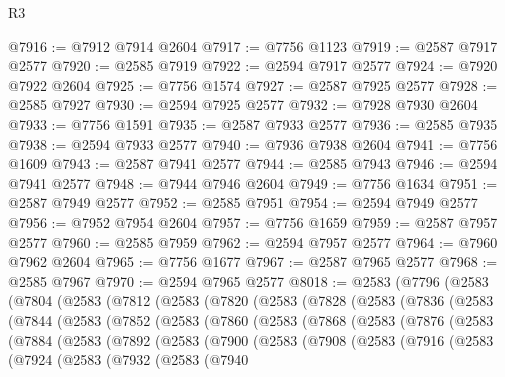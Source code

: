 \begin{lexlean}{R3}
\begin{coremodule}
@7916 := @7912 @7914 @2604
@7917 := @7756 @1123
@7919 := @2587 @7917 @2577
@7920 := @2585 @7919
@7922 := @2594 @7917 @2577
@7924 := @7920 @7922 @2604
@7925 := @7756 @1574
@7927 := @2587 @7925 @2577
@7928 := @2585 @7927
@7930 := @2594 @7925 @2577
@7932 := @7928 @7930 @2604
@7933 := @7756 @1591
@7935 := @2587 @7933 @2577
@7936 := @2585 @7935
@7938 := @2594 @7933 @2577
@7940 := @7936 @7938 @2604
@7941 := @7756 @1609
@7943 := @2587 @7941 @2577
@7944 := @2585 @7943
@7946 := @2594 @7941 @2577
@7948 := @7944 @7946 @2604
@7949 := @7756 @1634
@7951 := @2587 @7949 @2577
@7952 := @2585 @7951
@7954 := @2594 @7949 @2577
@7956 := @7952 @7954 @2604
@7957 := @7756 @1659
@7959 := @2587 @7957 @2577
@7960 := @2585 @7959
@7962 := @2594 @7957 @2577
@7964 := @7960 @7962 @2604
@7965 := @7756 @1677
@7967 := @2587 @7965 @2577
@7968 := @2585 @7967
@7970 := @2594 @7965 @2577
@8018 := @2583
    (@7796
      (@2583
        (@7804
          (@2583
            (@7812
              (@2583
                (@7820
                  (@2583
                    (@7828
                      (@2583
                        (@7836
                          (@2583
                            (@7844
                              (@2583
                                (@7852
                                  (@2583
                                    (@7860
                                      (@2583
                                        (@7868
                                          (@2583
                                            (@7876
                                              (@2583
                                                (@7884
                                                  (@2583
                                                    (@7892
                                                      (@2583
                                                        (@7900
                                                          (@2583
                                                            (@7908
                                                              (@2583
                                                                (@7916
                                                                  (@2583
                                                                    (@7924
                                                                      (@2583
                                                                        (@7932
                                                                          (@2583
                                                                            (@7940

\end{coremodule}
\end{lexlean}
